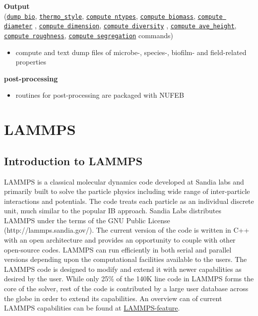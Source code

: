 \documentclass[11pt,a4paper,openright]{article}
\begin{document}
\noindent\textbf{Output}\\
\noindent(\hyperref[dumpbio]{\tt dump bio}, \href{http://lammps.sandia.gov/doc/thermo_style.html}{\tt thermo\_style},      \hyperref[cntypes]{\tt compute ntypes},
     \hyperref[cbiomass]{\tt compute biomass},
     \hyperref[cdiameter]{\tt compute diameter} ,
     \hyperref[cdimension]{\tt compute dimension},
     \hyperref[cdiversity]{\tt compute diversity} ,
     \hyperref[caveheight]{\tt compute ave\_height},
     \hyperref[croughness]{\tt compute roughness},
     \hyperref[csegregation]{\tt compute segregation}  commands) \\
     
\begin{itemize} [nosep]
\item compute and text dump files of microbe-, species-, biofilm- and field-related properties \\
\end{itemize} 

\noindent\textbf{post-processing}\\
\begin{itemize} [nosep]
\item routines for post-processing are packaged with NUFEB\\
\end{itemize} 


\section{LAMMPS}
\subsection{Introduction to LAMMPS}
LAMMPS is a classical molecular dynamics code developed at Sandia labs and primarily built to solve the particle physics including wide range of inter-particle interactions and potentials. The code treats each particle as an individual discrete unit, much similar to the popular IB approach. Sandia Labs distributes LAMMPS under the terms of the GNU Public License (http://lammps.sandia.gov/). The current version of the code is written in C++ with an open architecture and provides an opportunity to couple with other open-source codes. LAMMPS can run efficiently in both serial and parallel versions depending upon the computational facilities available to the users.  The LAMMPS code is designed to modify and extend it with newer capabilities as desired by the user. While only 25\% of the 140K line code in LAMMPS forms the core of the solver, rest of the code is contributed by a large user database across the globe in order to extend its capabilities. An overview can of current LAMMPS capabilities can be found at \href{http://lammps.sandia.gov/features.html}{LAMMPS-feature}.
\end{document}
